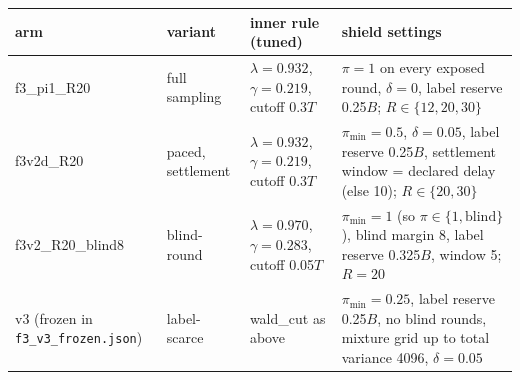 \begin{tabular}{@{}p{3.0cm}p{2.5cm}p{4.2cm}p{5.3cm}@{}}
\toprule
arm & variant & inner rule (tuned) & shield settings \\
\midrule
f3\_pi1\_R20 & full sampling & $\lambda=0.932$, $\gamma=0.219$, cutoff 0.3$T$ & $\pi=1$ on every exposed round, $\delta=0$, label reserve 0.25$B$; $R\in\{12,20,30\}$ \\
f3v2d\_R20 & paced, settlement & $\lambda=0.932$, $\gamma=0.219$, cutoff 0.3$T$ & $\pi_{\min}=0.5$, $\delta=0.05$, label reserve 0.25$B$, settlement window = declared delay (else 10); $R\in\{20,30\}$ \\
f3v2\_R20\_blind8 & blind-round & $\lambda=0.970$, $\gamma=0.283$, cutoff 0.05$T$ & $\pi_{\min}=1$ (so $\pi\in\{1,\text{blind}\}$), blind margin 8, label reserve 0.325$B$, window 5; $R=20$ \\
v3 (frozen in \texttt{f3\_v3\_frozen.json}) & label-scarce & wald\_cut as above & $\pi_{\min}=0.25$, label reserve 0.25$B$, no blind rounds, mixture grid up to total variance 4096, $\delta=0.05$ \\
\bottomrule
\end{tabular}
